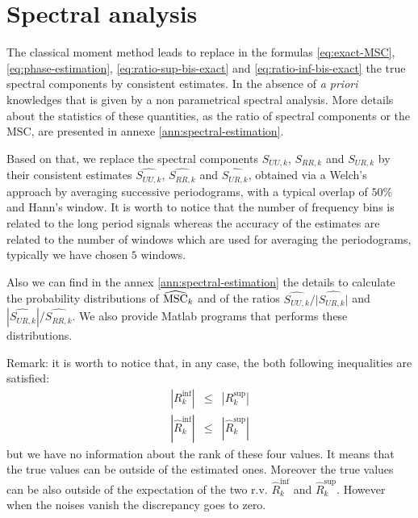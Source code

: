 \section{Spectral analysis}
The classical moment method leads to replace in the  formulas \eqref{eq:exact-MSC}, \eqref{eq:phase-estimation}, \eqref{eq:ratio-sup-bis-exact}  and \eqref{eq:ratio-inf-bis-exact} the true spectral components by consistent estimates. In the absence of {\it a priori} knowledges that is given by a non parametrical spectral analysis. More details about the statistics of these quantities, as  the ratio of spectral components or the MSC, are presented in annexe \ref{ann:spectral-estimation}. 



Based on that, we replace the spectral components $S_{UU,k}$, $S_{RR,k}$ and $S_{UR,k}$ by their consistent estimates $\widehat{S_{UU,k}}$, $\widehat{S_{RR,k}}$ and $\widehat{S_{UR,k}}$, obtained via a Welch's approach by averaging successive periodograms, with a typical overlap of $50\%$ and Hann's window. It is worth to notice that the number of frequency  bins is related to the long period signals whereas the accuracy of the estimates are related to the number of windows which are used for averaging the periodograms, typically we have chosen $5$ windows. 


Also we can find in the annex \ref{ann:spectral-estimation} the details to calculate the probability distributions of $\widehat{\mathrm{MSC}}_{k}$ and of the ratios $\widehat{S_{UU,k}}/|\widehat{S_{UR,k}|}$ and $|\widehat{S_{UR,k}}|/\widehat{S_{RR,k}}$. We also provide Matlab programs that performs these distributions. 


Remark: it is worth to notice that, in any case, the both following inequalities are satisfied:
\begin{eqnarray}
 |R_{k}^{\inf}|&\leq &|R_{k}^{\sup}|
 \\
  |\widehat{R}_{k}^{\inf}|&\leq &|\widehat{R}_{k}^{\sup}|
\end{eqnarray}
but we have no information about the rank of these four values. It means that the true values can be outside of the estimated ones. Moreover the true values can be also outside of the expectation of the two r.v. $\widehat{R}_{k}^{\inf}$ and $\widehat{R}_{k}^{\sup}$. However when the noises vanish the discrepancy goes to zero.

